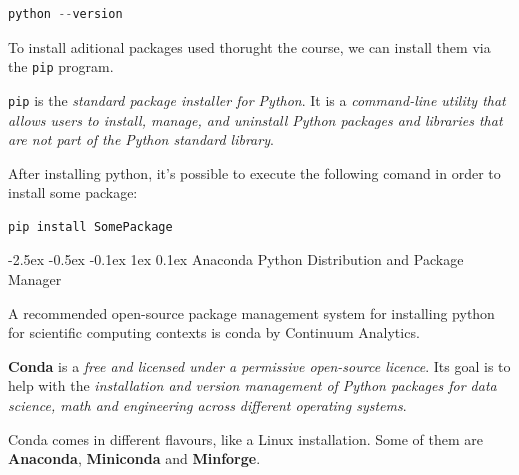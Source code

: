\documentclass[12pt]{report}
\makeatletter
\renewcommand{\section}{\@startsection{section}{1}{\z@}%
  {-2.5ex \@plus -0.5ex \@minus -0.1ex}%
  {1ex \@plus 0.1ex}%
  {\normalfont\Large\sectionstyle}}
\newcommand{\sectionstyle}[1]{%
  \par\noindent\hrule
  \vspace{0.2ex}%
  {\scshape{#1}\par}%
  \vspace{0.4ex}%
  \hrule
}
\theoremstyle{largebreak}
\makeatother
\begin{document}
    \begin{lstlisting}[caption={Check Python Version},label=code:chec_python_version, language = python]
python --version
    \end{lstlisting}

    \begin{obs}
        To install aditional packages used thorught the course, we can install them via the \lstinline|pip| program.
    \end{obs}

    \begin{mydef}
        \lstinline|pip| is the \textit{standard package installer for Python}. It is a \textit{command-line utility that allows users to install, manage, and uninstall Python packages and libraries that are not part of the Python standard library}.
    \end{mydef}

    After installing python, it's possible to execute the following comand in order to install some package:

    \begin{lstlisting}[caption={\lstinline|pip| Package Installation.},label=code:python_package_installation]
pip install SomePackage
    \end{lstlisting}

    \section{Anaconda Python Distribution and Package Manager}

    \begin{idea}
        A recommended open-source package management system for installing python for scientific computing contexts is conda by Continuum Analytics.
    \end{idea}

    \begin{mydef}
        \textbf{Conda} is a \textit{free and licensed under a permissive open-source licence}. Its goal is to help with the \textit{installation and version management of Python packages for data science, math and engineering across different operating systems}.
    \end{mydef}

    Conda comes in different flavours, like a Linux installation. Some of them are \textbf{Anaconda}, \textbf{Miniconda} and \textbf{Minforge}.
\end{document}
